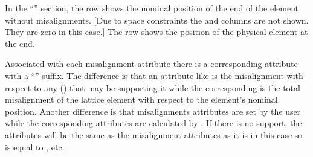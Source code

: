 \documentclass{hitec}     %
\begin{document}
In the ``'' section, the  row shows the nominal position of
the  end of the element without misalignments. [Due to space constraints the  and
 columns are not shown. They are zero in this case.] The  row shows the position
of the physical element at the  end.

Associated with each misalignment attribute there is a corresponding attribute with a ``''
suffix. The difference is that an attribute like  is the misalignment with respect to
any  () that may be supporting it while the corresponding
 is the total misalignment of the lattice element with respect to the element's
nominal position. Another difference is that misalignments attributes are set by the user while the
corresponding  attributes are calculated by \bmad. If there is no  support, the
 attributes will be the same as the misalignment attributes as it is in this case so
 is equal to , etc.

\newpage
\end{document}
